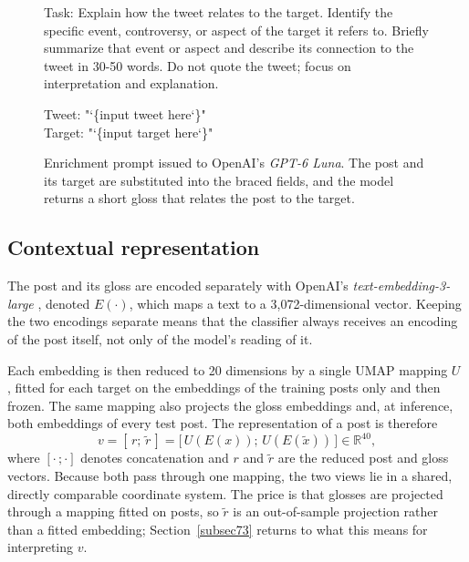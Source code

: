 \documentclass[pdflatex,sn-mathphys-num,iicol]{sn-jnl}%
\newcommand{\ttlbrace}{\char`\{}
\newcommand{\ttrbrace}{\char`\}}
\begin{document}
\begin{figure}[t]
	\centering
	\begin{tcolorbox}[colframe=snrule, colback=snbox, boxrule=0.6pt, arc=3pt, width=\linewidth, left=5pt, right=5pt, top=4pt, bottom=4pt]
		\footnotesize\ttfamily\raggedright\setlength{\parindent}{0pt}\setlength{\parskip}{0.25\baselineskip}\noindent
		Task: Explain how the tweet relates to the target. Identify the specific event, controversy, or aspect of the target it refers to. Briefly summarize that event or aspect and describe its connection to the tweet in 30-50 words. Do not quote the tweet; focus on interpretation and explanation.

		Tweet: "\ttlbrace input tweet here\ttrbrace" \\
		Target: "\ttlbrace input target here\ttrbrace"
	\end{tcolorbox}
	\caption{Enrichment prompt issued to OpenAI's \textit{GPT-6 Luna}. The post and its target are substituted into the braced fields, and the model returns a short gloss that relates the post to the target.}
	\label{fig:prompt}
\end{figure}

\subsection{Contextual representation}\label{subsec43}

The post and its gloss are encoded separately with OpenAI's \textit{text-embedding-3-large} \cite{openai-text-embedding-3-large}, denoted \(E(\cdot)\), which maps a text to a 3{,}072-dimensional vector. Keeping the two encodings separate means that the classifier always receives an encoding of the post itself, not only of the model's reading of it.

Each embedding is then reduced to 20 dimensions by a single UMAP mapping \(U\) \cite{mcinnes2018umap}, fitted for each target on the embeddings of the training posts only and then frozen. The same mapping also projects the gloss embeddings and, at inference, both embeddings of every test post. The representation of a post is therefore
\begin{equation}\label{eq:reduce}
v = [\,r;\, \tilde{r}\,] = \bigl[\,U(E(x));\, U(E(\tilde{x}))\,\bigr] \in \mathbb{R}^{40},
\end{equation}
where \([\cdot\,;\cdot]\) denotes concatenation and \(r\) and \(\tilde{r}\) are the reduced post and gloss vectors. Because both pass through one mapping, the two views lie in a shared, directly comparable coordinate system. The price is that glosses are projected through a mapping fitted on posts, so \(\tilde{r}\) is an out-of-sample projection rather than a fitted embedding; Section~\ref{subsec73} returns to what this means for interpreting \(v\).
\end{document}
